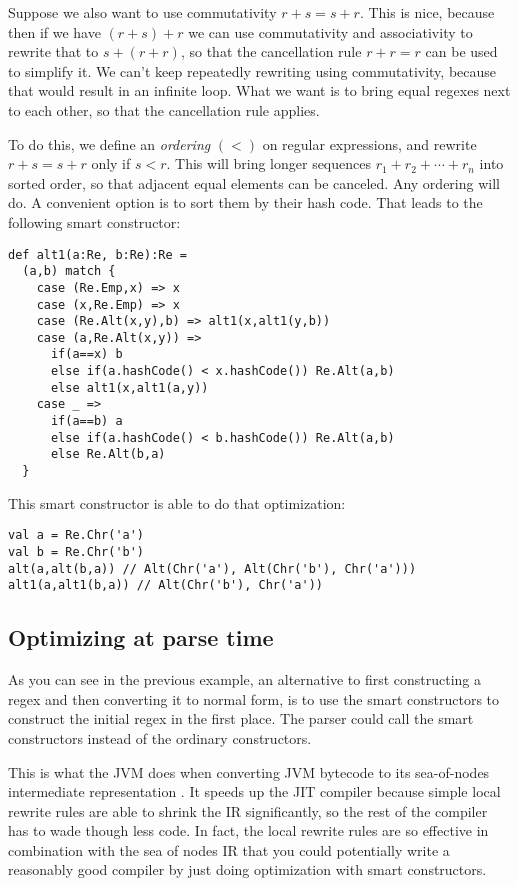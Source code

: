 Suppose we also want to use commutativity $r + s = s + r$. This is nice, because then if we have $(r + s) + r$ we can use commutativity and associativity to rewrite that to $s + (r + r)$, so that the cancellation rule $r + r = r$ can be used to simplify it. We can't keep repeatedly rewriting using commutativity, because that would result in an infinite loop. What we want is to bring equal regexes next to each other, so that the cancellation rule applies.

To do this, we define an \emph{ordering} $(<)$ on regular expressions, and rewrite $r + s = s + r$ only if $s < r$. This will bring longer sequences $r_1 + r_2 + \cdots + r_n$ into sorted order, so that adjacent equal elements can be canceled. Any ordering will do. A convenient option is to sort them by their hash code. That leads to the following smart constructor:

\begin{lstlisting}
def alt1(a:Re, b:Re):Re =
  (a,b) match {
    case (Re.Emp,x) => x
    case (x,Re.Emp) => x
    case (Re.Alt(x,y),b) => alt1(x,alt1(y,b))
    case (a,Re.Alt(x,y)) =>
      if(a==x) b
      else if(a.hashCode() < x.hashCode()) Re.Alt(a,b)
      else alt1(x,alt1(a,y))
    case _ =>
      if(a==b) a
      else if(a.hashCode() < b.hashCode()) Re.Alt(a,b)
      else Re.Alt(b,a)
  }
\end{lstlisting}

This smart constructor is able to do that optimization:

\begin{lstlisting}
val a = Re.Chr('a')
val b = Re.Chr('b')
alt(a,alt(b,a)) // Alt(Chr('a'), Alt(Chr('b'), Chr('a')))
alt1(a,alt1(b,a)) // Alt(Chr('b'), Chr('a'))
\end{lstlisting}

\subsection{Optimizing at parse time}

As you can see in the previous example, an alternative to first constructing a regex and then converting it to normal form, is to use the smart constructors to construct the initial regex in the first place. The parser could call the smart constructors instead of the ordinary constructors.

This is what the JVM does when converting JVM bytecode to its sea-of-nodes intermediate representation \cite{click95}. It speeds up the JIT compiler because simple local rewrite rules are able to shrink the IR significantly, so the rest of the compiler has to wade though less code. In fact, the local rewrite rules are so effective in combination with the sea of nodes IR that you could potentially write a reasonably good compiler by just doing optimization with smart constructors.


